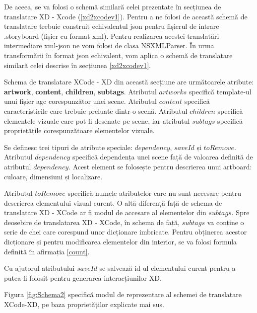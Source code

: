 De aceea, se va folosi o schemă similară celei prezentate în secțiunea de translatare XD - Xcode (\ref{xd2xcodev1}). Pentru a ne folosi de această schemă de translatare trebuie construit echivalentul json pentru fișierul de intrare .storyboard (fișier cu format xml). Pentru realizarea acestei translatări intermediare xml-json ne vom folosi de clasa NSXMLParser. În urma transformării în format json echivalent, vom aplica o schemă de translatare similară celei descrise în secțiunea \ref{xd2xcodev1}.

Schema de translatare XCode - XD din această secțiune are următoarele atribute: \textbf{artwork}, \textbf{content}, \textbf{children}, \textbf{subtags}. Atributul $artworks$ specifică template-ul unui fișier agc corespunzător unei scene. Atributul $content$ specifică caracteristicile care trebuie preluate dintr-o scenă. Atributul $children$ specifică elementele vizuale care pot fi desenate pe scene, iar atributul $subtags$ specifică proprietățile corespunzătoare elementelor vizuale.

Se definesc trei tipuri de atribute speciale: $dependency$, $saveId$ și $toRemove$. Atributul $dependency$ specifică
dependența unei scene față de valoarea definită de atributul $dependency$. Acest element se folosește pentru descrierea unui artboard: culoare, dimensiuni și localizare.

Atributul $toRemove$ specifică numele atributelor care nu sunt necesare pentru descrierea elementului vizual curent.
O altă diferență față de schema de translatare XD - XCode ar fi modul de accesare al elementelor din $subtags$.
Spre deosebire de translatarea XD - XCode, în schema de față, $subtags$ va conține o serie de chei care corespund unor dicționare imbricate. Pentru obținerea acestor dicționare și pentru modificarea elementelor din interior, se va folosi formula definită în afirmația \ref{count}.

Cu ajutorul atributului $saveId$ se salvează id-ul elementului curent pentru a putea fi folosit pentru generarea interacțiunilor XD.

Figura \ref{fig:Schema2} specifică modul de reprezentare al schemei de translatare XCode-XD, pe baza proprietăților explicate mai sus.

